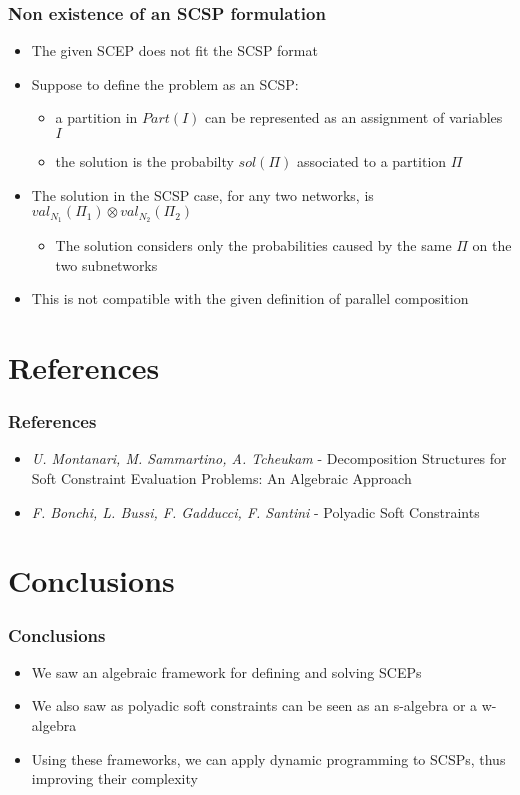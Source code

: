 \documentclass{beamer}
\begin{document}
\begin{frame}
\frametitle{Non existence of an SCSP formulation}
\begin{itemize}
	\item The given SCEP does not fit the SCSP format
\medskip
	\item Suppose to define the problem as an SCSP:
	\begin{itemize}
		\item a partition in $Part(I)$ can be represented as an assignment of variables $I$
		\item the solution is the probabilty $sol(\Pi)$ associated to a partition $\Pi$
	\end{itemize}
\medskip
	\item The solution in the SCSP case, for any two networks, is 
	$val_{N_1}(\Pi_1) \otimes val_{N_2}(\Pi_2)$
	\begin{itemize}
		\item The solution considers only the probabilities caused by the same $\Pi$ on the
		two subnetworks
	\end{itemize}
	\item This is not compatible with the given definition of parallel composition
\end{itemize}
\end{frame}

\section{References}

\begin{frame}
\frametitle{References}
\begin{itemize}
	\item \emph{U. Montanari, M. Sammartino, A. Tcheukam} - Decomposition Structures for
	Soft Constraint Evaluation Problems: An Algebraic Approach
\medskip
	\item \emph{F. Bonchi, L. Bussi, F. Gadducci, F. Santini} - Polyadic Soft Constraints
\end{itemize}
\end{frame}

\section{Conclusions}

\begin{frame}
\frametitle{Conclusions}
\begin{itemize}
	\item We saw an algebraic framework for defining and solving SCEPs
\medskip
	\item We also saw as polyadic soft constraints can be seen as an s-algebra or
	a w-algebra
\medskip
	\item Using these frameworks, we can apply dynamic programming to SCSPs, thus improving
	their complexity
\end{itemize}
\end{frame}
\end{document}
